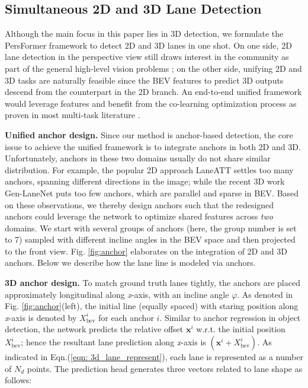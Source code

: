 \documentclass[runningheads]{llncs}
\begin{document}
\subsection{Simultaneous 2D and 3D Lane Detection}
\label{sec: alg - anchor}



Although the main focus in this paper lies in 3D detection, we formulate the  PersFormer framework to detect 2D and 3D lanes in one shot. On one side, 2D lane detection in the perspective view still draws interest in the community as part of the general high-level vision problems \cite{abualsaud2021laneaf,tabelini2021keep,liu2021condlanenet,qu2021focus}; on the other side, unifying 2D and 3D tasks are naturally feasible since the BEV features to predict 3D outputs descend from the counterpart in the 2D branch. An end-to-end unified framework would leverage features and benefit from the co-learning optimization process as proven in most multi-task literature \cite{liang2019multi,vandenhende2021multi,kumar2021omnidet}.  

\textbf{Unified anchor design.} 
Since our method is anchor-based detection, the core issue to achieve the unified framework is to integrate anchors in both 2D and 3D.
Unfortunately, anchors in these two domains usually do not share similar distribution. 
For example, the popular 2D approach LaneATT \cite{tabelini2021keep} settles too many anchors, spanning different directions in the image; while the 
recent 3D work Gen-LaneNet \cite{guo2020gen} puts too few anchors, which are parallel and sparse in BEV.
Based on these observations, 
we thereby
design anchors
such that 
the redesigned anchors could leverage the network to optimize shared features across \textit{two} domains.
We start with several groups of anchors (here, the group number is set to 7)  sampled with different incline angles in the BEV space and then projected to the front view.
Fig. \ref{fig:anchor} elaborates on the integration of 2D and 3D anchors.
Below we describe how the lane line is modeled via anchors.

\textbf{3D anchor design.} 
To match ground truth lanes tightly, 
the anchors are placed approximately longitudinal along \textit{x}-axis, with an incline angle $\varphi$.
As denoted in Fig. \ref{fig:anchor}(left), 
{the initial line (equally spaced) with staring  position along \textit{x}-axis is denoted by $X^i_{\text{bev}}$} for each anchor $i$.
Similar to anchor regression in object detection, the network predicts the relative offset $\textbf{x}^i$ w.r.t. the initial position
$X^i_{\text{bev}}$; hence the resultant lane prediction along \textit{x}-axis is $(\textbf{x}^i + X^i_{\text{bev}})$. 
As indicated in Eqn.(\ref{eqn: 3d_lane_represent}), each lane is represented as a number of $N_d$ points. The prediction head  generates three vectors related to lane shape as follows: 
\end{document}
